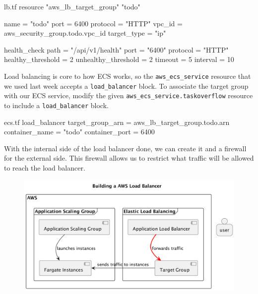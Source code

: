 \documentclass{csse4400}
\begin{document}
\begin{code}[language=terraform,numbers=none,keepspaces=true]{lb.tf}
resource "aws_lb_target_group" "todo" {
  name          = "todo"
  port          = 6400
  protocol      = "HTTP"
  vpc_id        = aws_security_group.todo.vpc_id
  target_type   = "ip"

  health_check {
    path                = "/api/v1/health"
    port                = "6400"
    protocol            = "HTTP"
    healthy_threshold   = 2
    unhealthy_threshold = 2
    timeout             = 5
    interval            = 10
  }
}
\end{code}

Load balancing is core to how ECS works, so the \texttt{aws\_ecs\_service} resource that we used last week accepts a \texttt{load\_balancer} block.
To associate the target group with our ECS service,
modify the given \texttt{aws\_ecs\_service.taskoverflow} resource to include a \texttt{load\_balancer} block.

\begin{code}[language=terraform,numbers=none,keepspaces=true]{ecs.tf}
  load_balancer {
    target_group_arn = aws_lb_target_group.todo.arn
    container_name   = "todo"
    container_port   = 6400
  }
\end{code}

With the internal side of the load balancer done, we can create it and a firewall for the external side.
This firewall allows us to restrict what traffic will be allowed to reach the load balancer.

\begin{figure}[H]
  \begin{center}
    \includegraphics[scale=0.2]{diagrams/lb3fargate}
  \end{center}
\end{figure}
\end{document}
